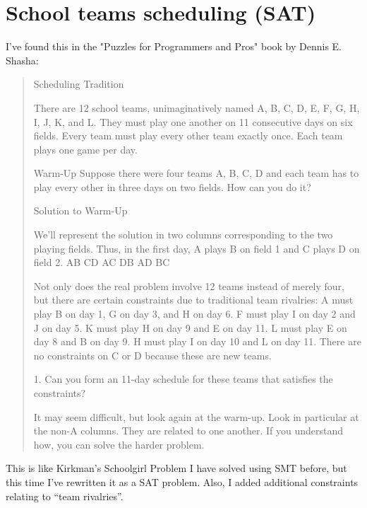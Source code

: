 \section{School teams scheduling (SAT)}

\renewcommand{\CURPATH}{SGP/SAT}

I've found this in the "Puzzles for Programmers and Pros" book by Dennis E. Shasha:

\begin{framed}
\begin{quotation}
Scheduling Tradition

There are 12 school teams, unimaginatively named A, B, C, D, E, F, G, H, I, J, K, and L. They must play one another on 11 consecutive days on six fields. 
Every team must play every other team exactly once. Each team plays one game per day.

        Warm-Up
                Suppose there were four teams A, B, C, D and each team has to play every other in three days on two fields. How can you do it?

        Solution to Warm-Up

                We’ll represent the solution in two columns corresponding to the two playing fields. Thus, in the first day, A plays B on field 1 and C plays D on field 2.
                AB CD
                AC DB
                AD BC

Not only does the real problem involve 12 teams instead of merely four, but there are certain constraints due to traditional team rivalries: 
A must play B on day 1, G on day 3, and H on day 6. F must play I on day 2 and J on day 5.  K must play H on day 9 and E on day 11. 
L must play E on day 8 and B on day 9. H must play I on day 10 and L on day 11. There are no constraints on C or D because these are new teams.

        1. Can you form an 11-day schedule for these teams that satisfies the constraints?

It may seem difficult, but look again at the warm-up. Look in particular at the non-A columns. They are related to one another.
If you understand how, you can solve the harder problem.
\end{quotation}
\end{framed}

This is like Kirkman's Schoolgirl Problem I have solved using SMT before, but this time I've rewritten it as a SAT problem.
Also, I added additional constraints relating to ``team rivalries''.

